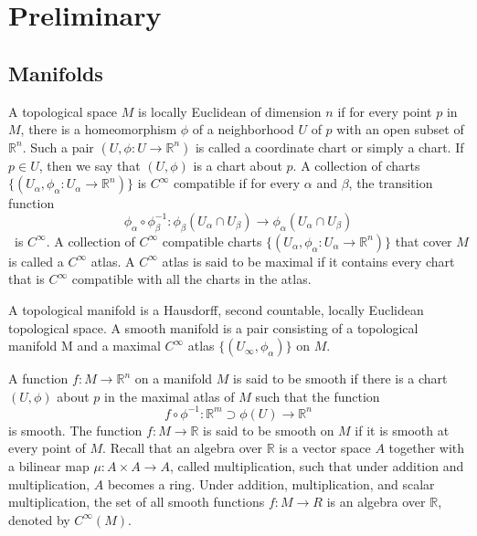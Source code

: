 \section{Preliminary}

\subsection{Manifolds}

\begin{definition}
    A topological space $M$ is locally Euclidean of dimension $n$ if for every point $p$ in $M$, there is a homeomorphism $\phi$ of a neighborhood $U$ of $p$ with an open subset of $\mathbb{R}^n$. Such a pair $(U, \phi: U \to \mathbb{R}^n)$ is called a coordinate chart or simply a chart. If $p \in U$, then we say that $(U,\phi)$ is a chart about $p$. A collection of charts $\{(U_{\alpha},\phi_{\alpha}: U_{\alpha} \to \mathbb{R}^n)\}$ is $C^{\infty}$ compatible if for every $\alpha$ and $\beta$, the transition function
    \[\phi_{\alpha}\circ \phi^{-1}_{\beta}: \phi_{\beta}(U_{\alpha}\cap U_{\beta}) \to \phi_{\alpha}(U_{\alpha}\cap U_{\beta})\]\
    is $C^{\infty}$. A collection of $C^{\infty}$ compatible charts $\{(U_{\alpha},\phi_{\alpha} : U_{\alpha} \to \mathbb{R}^n)\}$ that cover $M$ is
called a $C^{\infty}$ atlas. A $C^{\infty}$ atlas is said to be maximal if it contains every chart that is
$C^{\infty}$ compatible with all the charts in the atlas.
\end{definition}

\begin{definition}
    A topological manifold is a Hausdorff, second countable, locally Euclidean topological space. A smooth manifold is a pair consisting of a
topological manifold M and a maximal $C^{\infty}$ atlas $\{(U_{\infty},\phi_{\alpha})\}$ on $M$. 
\end{definition}

\begin{definition}
    A function $f:M\to\mathbb{R}^n$ on a manifold $M$ is said to be smooth if there is a chart $(U,\phi)$ about $p$ in the maximal atlas of $M$ such that the function \[
    f\circ \phi^{-1}: \mathbb{R}^m \supset \phi(U) \to \mathbb{R}^n
    \]
    is smooth. The function $f:M\to \mathbb{R}$ is said to be smooth on $M$ if it is smooth at every
point of $M$. Recall that an algebra over $\mathbb{R}$ is a vector space $A$ together with a bilinear
map $\mu: A\times A \to A$, called multiplication, such that under addition and multiplication, $A$ becomes a ring. Under addition, multiplication, and scalar multiplication, the set of all smooth functions $f : M \to R$ is an algebra over $\mathbb{R}$, denoted by $C^{\infty}(M)$.
\end{definition}

